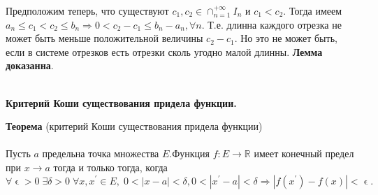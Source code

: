 \documentclass[12pt]{article}
\begin{document}
\noindent Предположим теперь, что существуют $c_{1}, c_{2} \in \cap_{n=1}^{+\infty} I_{n}$ и $c_{1} < c_{2}$. Тогда имеем $a_{n} \leqslant c_{1} < c_{2} \leqslant b_{n} \Rightarrow 0 < c_{2} - c_{1} \leqslant b_{n} - a_{n}, \forall  n$. Т.е. длинна каждого отрезка не может быть меньше положительной величины $c_{2} - c_{1}$. Но это не может быть, если в системе отрезков есть отрезки сколь угодно малой длинны. \textbf{Лемма доказанна}. \\\\
\newpage
\begin{center}
    \large\textbf{Критерий Коши существования придела функции.}
\end{center}
\noindent \textbf{Теорема} (критерий Коши существования придела функции)\\\\
\noindent Пусть $a$ предельна точка множества $E$.Функция $f: E \to \mathds R$ имеет конечный предел при $x \to a$ тогда и только тогда, когда
\begin{equation*}
    \forall \upvarepsilon > 0 \;  \exists \delta > 0 \;  \forall x, x^{\prime} \in E, \; 0 < |x - a| < \delta, 0 < |x^{\prime} - a| < \delta \Rightarrow |f(x^{\prime}) - f(x)| < \upvarepsilon .
\end{equation*}
\end{document}
